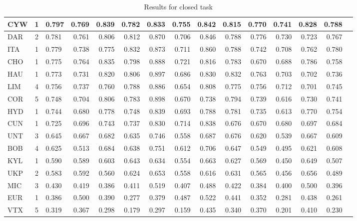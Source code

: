 \documentclass[11pt,letterpaper]{article}
\begin{document}
\begin{table*}
\begin{small}
\begin{tabular}{|p{1cm}|c|p{1cm}|r|r|r|r|r|r|r|r|r|r|r|r|}
 CYW  & 1  & 0.797 & 0.769 & 0.839 & 0.782 & 0.833 & 0.755 & 0.842 & 0.815 & 0.770 & 0.741 & 0.828 & 0.788\\\hline
DAR   & 2  & 0.781 & 0.761 & 0.806 & 0.812 & 0.870 & 0.706 & 0.846 & 0.788 & 0.776 & 0.730 & 0.723 & 0.767\\\hline
 ITA  & 1  & 0.779 & 0.738 & 0.775 & 0.832 & 0.873 & 0.711 & 0.860 & 0.788 & 0.742 & 0.708 & 0.762 & 0.780\\\hline
CHO  & 1  & 0.775 & 0.764 & 0.835 & 0.798 & 0.888 & 0.721 & 0.816 & 0.783 & 0.670 & 0.688 & 0.786 & 0.758\\\hline
HAU  & 1  & 0.773 & 0.731 & 0.820 & 0.806 & 0.897 & 0.686 & 0.830 & 0.832 & 0.763 & 0.703 & 0.702 & 0.736\\\hline
LIM   & 4  & 0.756 & 0.737 & 0.760 & 0.788 & 0.886 & 0.654 & 0.808 & 0.775 & 0.756 & 0.712 & 0.701 & 0.745\\\hline
 COR  & 5  & 0.748 & 0.704 & 0.806 & 0.783 & 0.898 & 0.670 & 0.738 & 0.794 & 0.739 & 0.616 & 0.730 & 0.741\\\hline
 HYD  & 1  & 0.744 & 0.680 & 0.778 & 0.748 & 0.839 & 0.693 & 0.788 & 0.781 & 0.735 & 0.613 & 0.770 & 0.754\\\hline
 CUN  & 1  & 0.725 & 0.696 & 0.743 & 0.737 & 0.830 & 0.714 & 0.838 & 0.676 & 0.670 & 0.680 & 0.697 & 0.684\\\hline
  UNT & 3  & 0.645 & 0.667 & 0.682 & 0.635 & 0.746 & 0.558 & 0.687 & 0.676 & 0.620 & 0.539 & 0.667 & 0.609\\\hline
BOB   & 4  & 0.625 & 0.513 & 0.684 & 0.638 & 0.751 & 0.612 & 0.706 & 0.647 & 0.549 & 0.495 & 0.621 & 0.608\\\hline
KYL  & 1  & 0.590 & 0.589 & 0.603 & 0.643 & 0.634 & 0.554 & 0.663 & 0.627 & 0.569 & 0.450 & 0.649 & 0.507\\\hline
 UKP  & 2  & 0.583 & 0.592 & 0.560 & 0.624 & 0.653 & 0.558 & 0.616 & 0.631 & 0.565 & 0.456 & 0.656 & 0.489\\\hline
 MIC  & 3  & 0.430 & 0.419 & 0.386 & 0.411 & 0.519 & 0.407 & 0.488 & 0.422 & 0.384 & 0.400 & 0.500 & 0.396\\\hline
EUR   & 1  & 0.386 & 0.500 & 0.390 & 0.277 & 0.379 & 0.487 & 0.522 & 0.441 & 0.352 & 0.281 & 0.438 & 0.261\\\hline
 VTX & 5  & 0.319 & 0.367 & 0.298 & 0.179 & 0.297 & 0.159 & 0.435 & 0.340 & 0.370 & 0.201 & 0.410 & 0.230\\\hline
\end{tabular}
\caption{Results for closed task\label{tab:results:closed}}
\end{small}
\end{table*}
\end{document}

